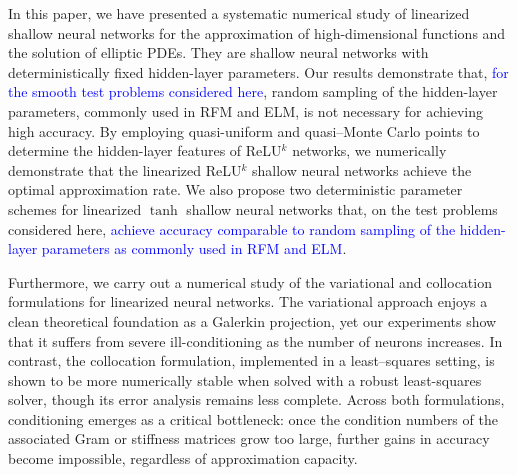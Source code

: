 \documentclass{article}
\theoremstyle{remark}
\begin{document}
In this paper, we have presented a systematic numerical study of linearized shallow neural networks for the approximation of high-dimensional functions and the 
solution of elliptic PDEs. 
They are shallow neural networks with deterministically fixed hidden-layer parameters. 
Our results demonstrate that, \textcolor{blue}{for the smooth test problems considered here}, random sampling of the hidden-layer parameters, commonly used in RFM and ELM, is not necessary for achieving high accuracy. 
By employing quasi-uniform and quasi–Monte Carlo points to determine the hidden-layer features of ReLU$^k$ networks, we numerically demonstrate that the linearized ReLU$^k$ shallow neural networks achieve the optimal approximation rate.
We also propose two deterministic parameter schemes for linearized $\tanh$ shallow neural networks that, on the test problems considered here, \textcolor{blue}{achieve accuracy comparable to random sampling of the hidden-layer parameters as commonly used in RFM and ELM}.

Furthermore, we carry out a numerical study of the variational and collocation 
formulations for linearized neural networks. 
The variational approach enjoys a clean theoretical foundation as a 
Galerkin projection, yet our experiments show that it suffers from severe 
ill-conditioning as the number of neurons increases. 
In contrast, the collocation 
formulation, implemented in a least–squares setting, is shown to be more numerically stable when solved with a robust least-squares solver, though its error analysis remains less complete. 
Across both formulations, conditioning emerges as a critical bottleneck: once the 
condition numbers of the associated Gram or stiffness matrices grow too large, further gains in accuracy become impossible, regardless of approximation capacity.

\end{document}
